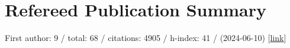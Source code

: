 \section*{Refereed Publication Summary}

First author: 9 / total: 68 / citations: 4905 / h-index: 41 / (2024-06-10) [\href{https://ui.adsabs.harvard.edu/#/public-libraries/G0Ow9TGTRyuVT7hbhzailA}{link}]
